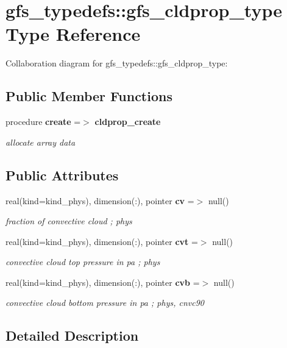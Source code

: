 \section{gfs\+\_\+typedefs\+:\+:gfs\+\_\+cldprop\+\_\+type Type Reference}
\label{structgfs__typedefs_1_1gfs__cldprop__type}


Collaboration diagram for gfs\+\_\+typedefs\+:\+:gfs\+\_\+cldprop\+\_\+type\+:
\subsection*{Public Member Functions}
\begin{DoxyCompactItemize}
\item 
procedure \textbf{ create} =$>$ \textbf{ cldprop\+\_\+create}
\begin{DoxyCompactList}\small\item\em allocate array data \end{DoxyCompactList}\end{DoxyCompactItemize}
\subsection*{Public Attributes}
\begin{DoxyCompactItemize}
\item 
real(kind=kind\+\_\+phys), dimension(\+:), pointer \textbf{ cv} =$>$ null()
\begin{DoxyCompactList}\small\item\em fraction of convective cloud ; phys \end{DoxyCompactList}\item 
real(kind=kind\+\_\+phys), dimension(\+:), pointer \textbf{ cvt} =$>$ null()
\begin{DoxyCompactList}\small\item\em convective cloud top pressure in pa ; phys \end{DoxyCompactList}\item 
real(kind=kind\+\_\+phys), dimension(\+:), pointer \textbf{ cvb} =$>$ null()
\begin{DoxyCompactList}\small\item\em convective cloud bottom pressure in pa ; phys, cnvc90 \end{DoxyCompactList}\end{DoxyCompactItemize}


\subsection{Detailed Description}


